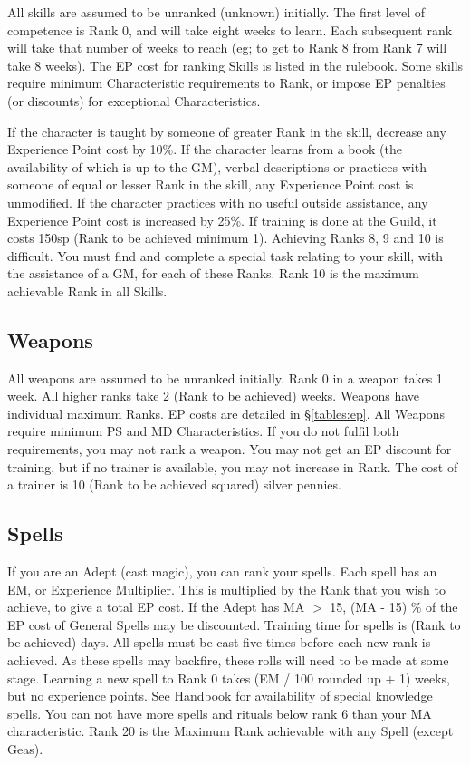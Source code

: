 \begin{multicols}{3}
All skills are assumed to be unranked (\ie unknown) initially. The
first level of competence is Rank 0, and will take eight weeks to
learn. Each subsequent rank will take that number of weeks to reach
(eg; to get to Rank 8 from Rank 7 will take 8 weeks). The EP cost for
ranking Skills is listed in the rulebook.  Some skills require minimum
Characteristic requirements to Rank, or impose EP penalties (or
discounts) for exceptional Characteristics.

If the character is taught by someone of greater Rank in the skill,
decrease any Experience Point cost by 10\%.  If the character learns
from a book (the availability of which is up to the GM), verbal
descriptions or practices with someone of equal or lesser Rank in the
skill, any Experience Point cost is unmodified.  If the character
practices with no useful outside assistance, any Experience Point cost
is increased by 25\%.  If training is done at the Guild, it costs
150sp \x (Rank to be achieved minimum 1). Achieving Ranks 8, 9 and 10
is difficult.  You must find and complete a special task relating to
your skill, with the assistance of a GM, for each of these Ranks. Rank
10 is the maximum achievable Rank in all Skills.

\subsection{Weapons}

All weapons are assumed to be unranked initially.  Rank 0 in a weapon
takes 1 week. All higher ranks take 2 \x (Rank to be achieved)
weeks. Weapons have individual maximum Ranks.  EP costs are detailed
in \S\ref{tables:ep}.  All Weapons require minimum PS and MD
Characteristics. If you do not fulfil both requirements, you may not
rank a weapon.  You may not get an EP discount for training, but if no
trainer is available, you may not increase in Rank.  The cost of a
trainer is 10 \x (Rank to be achieved squared) silver pennies.

\subsection{Spells}

If you are an Adept (\ie cast magic), you can rank your spells.
Each spell has an EM, or Experience Multiplier. This is multiplied by
the Rank that you wish to achieve, to give a total EP cost. If the
Adept has MA $>$ 15, (MA - 15) \% of the EP cost of General Spells
may be discounted. Training time for spells is (Rank to be achieved)
days.  All spells must be cast five times before each new rank is
achieved. As these spells may backfire, these rolls will need to be
made at some stage.  Learning a new spell to Rank 0 takes (EM / 100
rounded up + 1) weeks, but no experience points. See Handbook for
availability of special knowledge spells.  You can not have more
spells and rituals below rank 6 than your MA characteristic.  Rank 20
is the Maximum Rank achievable with any Spell (except Geas).


\end{multicols}
